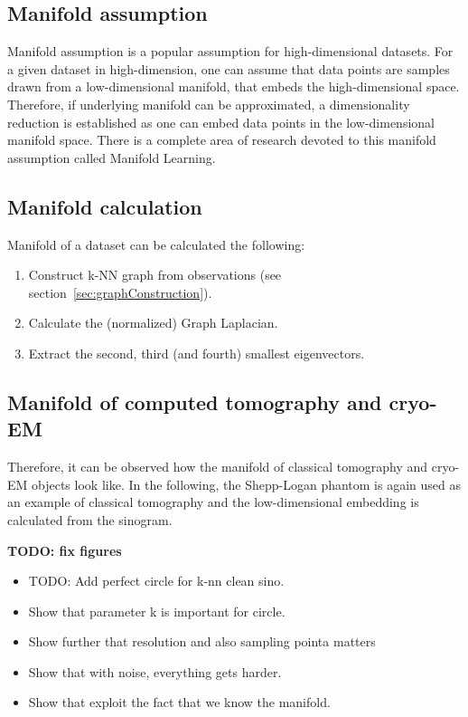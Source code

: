 \subsection{Manifold assumption}
\label{sec:manifoldAssumption}
Manifold assumption is a popular assumption for high-dimensional datasets.
For a given dataset in high-dimension, one can assume that data points are samples drawn from a low-dimensional manifold,
that embeds the high-dimensional space. 
Therefore, if underlying manifold can be approximated, a dimensionality reduction
is established as one can embed data points in the low-dimensional manifold space.
There is a complete area of research devoted to this manifold assumption called Manifold Learning\cite{ManifoldLearning}.

\subsection{Manifold calculation}
\label{sec:manifold_calculation}
Manifold of a dataset can be calculated the following:

\begin{enumerate}
    \item Construct k-NN graph from observations (see section~\ref{sec:graphConstruction}).
    \item Calculate the (normalized) Graph Laplacian.
    \item Extract the second, third (and fourth) smallest eigenvectors.
\end{enumerate}



\subsection{Manifold of computed tomography and cryo-EM}

Therefore, it can be observed how the manifold of classical tomography and cryo-EM objects look like.
In the following, the Shepp-Logan phantom is again used as an example of classical tomography
and the low-dimensional embedding is calculated from the sinogram.


\textbf{TODO: fix figures}
\begin{itemize}
    
    \item TODO: Add perfect circle for k-nn clean sino.
    \item Show that parameter k is important for circle.
    \item Show further that resolution and also sampling pointa matters
    \item Show that with noise, everything gets harder.
    \item Show that exploit the fact that we know the manifold.
\end{itemize}


